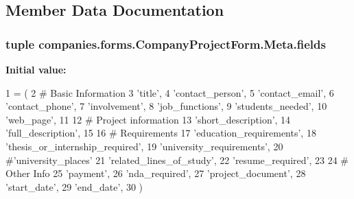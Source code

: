 \subsection{Member Data Documentation}
\hypertarget{classcompanies_1_1forms_1_1_company_project_form_1_1_meta_a203ec8fb5710890f2c8891d90e004ac8}{
\subsubsection[{fields}]{\setlength{\rightskip}{0pt plus 5cm}tuple companies.\-forms.\-Company\-Project\-Form.\-Meta.\-fields\hspace{0.3cm}{\ttfamily [static]}}}\label{classcompanies_1_1forms_1_1_company_project_form_1_1_meta_a203ec8fb5710890f2c8891d90e004ac8}
{\bfseries Initial value\-:}
\begin{DoxyCode}
1 = (
2             \textcolor{comment}{# Basic Information}
3             \textcolor{stringliteral}{'title'},
4             \textcolor{stringliteral}{'contact\_person'},
5             \textcolor{stringliteral}{'contact\_email'},
6             \textcolor{stringliteral}{'contact\_phone'},
7             \textcolor{stringliteral}{'involvement'},
8             \textcolor{stringliteral}{'job\_functions'},
9             \textcolor{stringliteral}{'students\_needed'},
10             \textcolor{stringliteral}{'web\_page'},
11 
12             \textcolor{comment}{# Project information}
13             \textcolor{stringliteral}{'short\_description'},
14             \textcolor{stringliteral}{'full\_description'},
15 
16             \textcolor{comment}{# Requirements}
17             \textcolor{stringliteral}{'education\_requirements'},
18             \textcolor{stringliteral}{'thesis\_or\_internship\_required'},
19             \textcolor{stringliteral}{'university\_requirements'},
20             \textcolor{comment}{#'university\_places'}
21             \textcolor{stringliteral}{'related\_lines\_of\_study'},
22             \textcolor{stringliteral}{'resume\_required'},
23 
24             \textcolor{comment}{# Other Info}
25             \textcolor{stringliteral}{'payment'},
26             \textcolor{stringliteral}{'nda\_required'},
27             \textcolor{stringliteral}{'project\_document'},
28             \textcolor{stringliteral}{'start\_date'},
29             \textcolor{stringliteral}{'end\_date'},
30         )
\end{DoxyCode}
